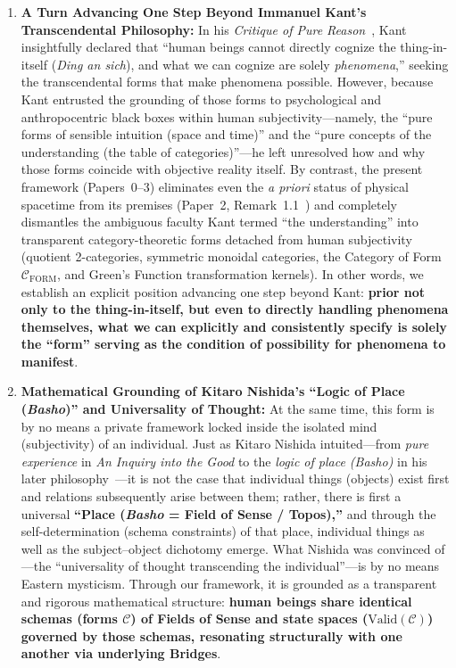 \documentclass[11pt,a4paper]{article}
\theoremstyle{definition}
\theoremstyle{plain}
\theoremstyle{remark}
\newcommand{\Valid}{\mathrm{Valid}}
\newcommand{\CFORM}{\mathcal{C}_{\mathrm{FORM}}}
\begin{document}
\begin{enumerate}
    \item \textbf{A Turn Advancing One Step Beyond Immanuel Kant's Transcendental Philosophy:}
    In his \emph{Critique of Pure Reason}~\cite{kant1781}, Kant insightfully declared that ``human beings cannot directly cognize the thing-in-itself (\emph{Ding an sich}), and what we can cognize are solely \emph{phenomena},'' seeking the transcendental forms that make phenomena possible. However, because Kant entrusted the grounding of those forms to psychological and anthropocentric black boxes within human subjectivity---namely, the ``pure forms of sensible intuition (space and time)'' and the ``pure concepts of the understanding (the table of categories)''---he left unresolved how and why those forms coincide with objective reality itself.
    By contrast, the present framework (Papers~0--3) eliminates even the \emph{a priori} status of physical spacetime from its premises (Paper~2, Remark~1.1~\cite{ota2026paper2}) and completely dismantles the ambiguous faculty Kant termed ``the understanding'' into transparent category-theoretic forms detached from human subjectivity (quotient 2-categories, symmetric monoidal categories, the Category of Form $\CFORM$, and Green's Function transformation kernels). In other words, we establish an explicit position advancing one step beyond Kant: \textbf{prior not only to the thing-in-itself, but even to directly handling phenomena themselves, what we can explicitly and consistently specify is solely the ``form'' serving as the condition of possibility for phenomena to manifest}.

    \item \textbf{Mathematical Grounding of Kitaro Nishida's ``Logic of Place (\emph{Basho})'' and Universality of Thought:}
    At the same time, this form is by no means a private framework locked inside the isolated mind (subjectivity) of an individual. Just as Kitaro Nishida intuited---from \emph{pure experience} in \emph{An Inquiry into the Good} to the \emph{logic of place (Basho)} in his later philosophy~\cite{nishida1911,nishida1927}---it is not the case that individual things (objects) exist first and relations subsequently arise between them; rather, there is first a universal \textbf{``Place (\emph{Basho} = Field of Sense / Topos),''} and through the self-determination (schema constraints) of that place, individual things as well as the subject--object dichotomy emerge.
    What Nishida was convinced of---the ``universality of thought transcending the individual''---is by no means Eastern mysticism. Through our framework, it is grounded as a transparent and rigorous mathematical structure: \textbf{human beings share identical schemas (forms $\mathcal{C}$) of Fields of Sense and state spaces ($\Valid(\mathcal{C})$) governed by those schemas, resonating structurally with one another via underlying Bridges}.
\end{enumerate}
\end{document}
